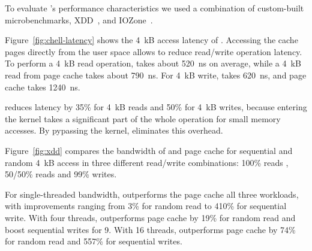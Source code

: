 
To evaluate \CChell{}'s performance characteristics we used a combination of
custom-built microbenchmarks, XDD~\cite{xdd}, and IOZone~\cite{iozone}.

Figure~\ref{fig:chell-latency} shows the 4~kB access latency of \CChell{}.
Accessing the cache pages
directly from the user space allows \CChell{} to reduce read/write operation
latency.  To perform a 4~kB read operation, \CChell{} takes
about 520~ns on average, while a 4~kB read from page cache takes about 790~ns.
For 4~kB write, \CChell{} takes 620~ns, and page cache takes 1240~ns.

\CChell{} reduces latency by 35\% for 4~kB reads and 50\% for 4~kB writes, because entering the kernel
takes a significant part
of the whole operation for small memory accesses. By pypassing the kernel,
\CChell{} eliminates this overhead. 

Figure~\ref{fig:xdd} compares the bandwidth of \CChell{} and page cache for sequential and
random 4~kB access in three different read/write combinations: 100\% reads
, 50/50\% reads and 99\% writes.

For single-threaded bandwidth, \CChell{} outperforms the page cache 
all three workloads, with improvements ranging from 3\% for random read to
410\% for sequential write.  With four threads,
\CChell{} outperforms page cache by 19\% for random read and boost sequential writes
for 9\x{}.
With 16 threads, \CChell{} outperforms page cache by 74\% for random read and
557\% for sequential writes.



